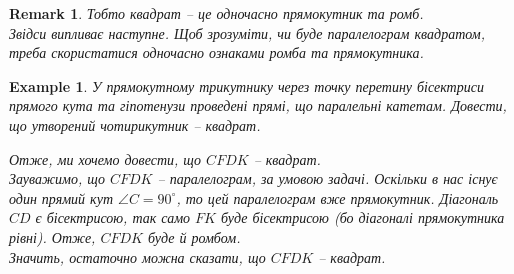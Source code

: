 \documentclass[a4paper, 10pt]{article}
\theoremstyle{theoremdd}
\theoremstyle{theoremdd}
\theoremstyle{theoremdd}
\theoremstyle{theoremdd}
\theoremstyle{theoremdd}
\newtheorem{example}[theorem]{Example}
\theoremstyle{theoremdd}
\theoremstyle{theoremdd}
\newtheorem{remark}[theorem]{Remark}
\theoremstyle{theoremdd}
\theoremstyle{theoremdd}
\begin{document}
\begin{remark}
Тобто квадрат -- це одночасно прямокутник та ромб.\\
Звідси випливає наступне. Щоб зрозуміти, чи буде паралелограм квадратом, треба скористатися одночасно ознаками ромба та прямокутника.
\end{remark}

\begin{example}
У прямокутному трикутнику через точку перетину бісектриси прямого кута та гіпотенузи проведені прямі, що паралельні катетам. Довести, що утворений чотирикутник -- квадрат.
\begin{figure}[H]
\centering
{}
\end{figure}
Отже, ми хочемо довести, що $CFDK$ -- квадрат.\\
Зауважимо, що $CFDK$ -- паралелограм, за умовою задачі. Оскільки в нас існує один прямий кут $\angle C = 90^\circ$, то цей паралелограм вже прямокутник. Діагональ $CD$ є бісектрисою, так само $FK$ буде бісектрисою (бо діагоналі прямокутника рівні). Отже, $CFDK$ буде й ромбом.\\
Значить, остаточно можна сказати, що $CFDK$ -- квадрат.
\end{example}
\end{document}
